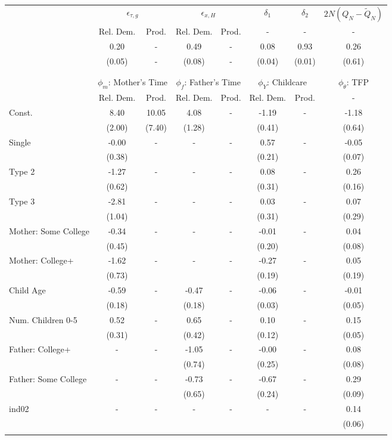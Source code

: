 \begin{tabular}{lccccccc}\toprule
 & \multicolumn{2}{c}{$\epsilon_{\tau,g}$} & \multicolumn{2}{c}{$\epsilon_{x,H}$} & {$\delta_{1}$} & {$\delta_{2}$} & $2N(Q_{N} - \tilde{Q}_{N})$ \\
 & Rel. Dem. & Prod. & Rel. Dem. & Prod. & - & - & - \\\cmidrule(r){2-3}\cmidrule(r){4-5}\cmidrule(r){6-6}\cmidrule(r){7-7}\cmidrule(r){8-8}
&0.20& - &0.49& - &0.08&0.93&0.26\\
&(0.05)& - &(0.08)& - &(0.04)&(0.01)&(0.61)\\
\\
&&&&&&&\\
 & \multicolumn{2}{c}{$\phi_{m}$: Mother's Time} & \multicolumn{2}{c}{$\phi_{f}$: Father's Time} & \multicolumn{2}{c}{$\phi_{Y}$: Childcare} &{$\phi_{\theta}$: TFP} \\
 & Rel. Dem. & Prod. & Rel. Dem. & Prod. & Rel. Dem. & Prod. & -  \\\cmidrule(r){2-3}\cmidrule(r){4-5}\cmidrule(r){6-7}\cmidrule(r){8-8}
Const.&8.40&10.05&4.08& -&-1.19& -&-1.18\\
&(2.00)&(7.40)&(1.28)&&(0.41)&&(0.64)\\
Single&-0.00& -& - & -&0.57& -&-0.05\\
&(0.38)& & &&(0.21)&&(0.07)\\
Type 2&-1.27& -& - & -&0.08& -&0.26\\
&(0.62)& & &&(0.31)&&(0.16)\\
Type 3&-2.81& -& - & -&0.03& -&0.07\\
&(1.04)& & &&(0.31)&&(0.29)\\
Mother: Some College&-0.34& -& - & -&-0.01& -&0.04\\
&(0.45)& & &&(0.20)&&(0.08)\\
Mother: College+&-1.62& -& - & -&-0.27& -&0.05\\
&(0.73)& & &&(0.19)&&(0.19)\\
Child Age&-0.59& -&-0.47& -&-0.06& -&-0.01\\
&(0.18)&&(0.18)&&(0.03)&&(0.05)\\
Num. Children 0-5&0.52& -&0.65& -&0.10& -&0.15\\
&(0.31)&&(0.42)&&(0.12)&&(0.05)\\
Father: College+& - & -&-1.05& -&-0.00& -&0.08\\
 & &&(0.74)&&(0.25)&&(0.08)\\
Father: Some College& - & -&-0.73& -&-0.67& -&0.29\\
 & &&(0.65)&&(0.24)&&(0.09)\\
ind02& - & -& - & -& - & -&0.14\\
 & & & & & &&(0.06)\\
\\
\bottomrule\end{tabular}